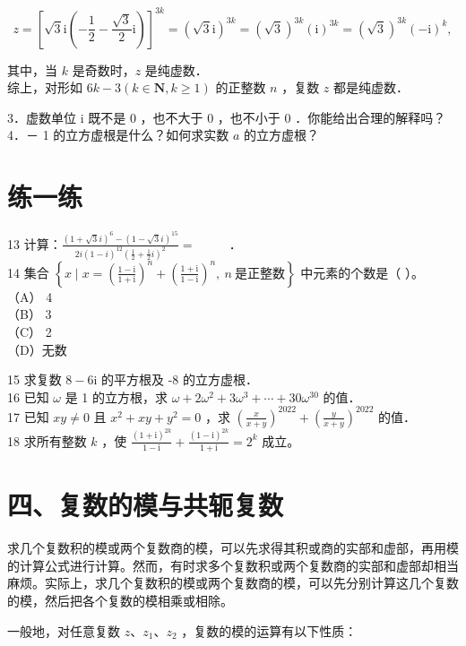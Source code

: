 \documentclass[10pt]{article}
\begin{document}
\[
z=\left[\sqrt{3} \mathrm{i}\left(-\frac{1}{2}-\frac{\sqrt{3}}{2} \mathrm{i}\right)\right]^{3 k}=(\sqrt{3} \mathrm{i})^{3 k}=(\sqrt{3})^{3 k}(\mathrm{i})^{3 k}=(\sqrt{3})^{3 k}(-\mathrm{i})^{k},
\]

其中，当 \(k\) 是奇数时，\(z\) 是纯虚数．\\
综上，对形如 \(6 k-3(k \in \mathbf{N}, k \geqslant 1)\) 的正整数 \(n\) ，复数 \(z\) 都是纯虚数．

3．虚数单位 i 既不是 0 ，也不大于 0 ，也不小于 0 ．你能给出合理的解释吗？\\
4．－ 1 的立方虚根是什么？如何求实数 \(a\) 的立方虚根？

\section*{练一练}
13 计算：\(\frac{(1+\sqrt{3} i)^{6}-(1-\sqrt{3} i)^{15}}{2 i(1-i)^{12}\left(\frac{1}{2}+\frac{1}{2} i\right)^{2}}=\) \(\qquad\) ．\\
14 集合 \(\left\{x \mid x=\left(\frac{1-\mathrm{i}}{1+\mathrm{i}}\right)^{n}+\left(\frac{1+\mathrm{i}}{1-\mathrm{i}}\right)^{n},\ n\ \text{是正整数}\right\}\) 中元素的个数是（ ）。\\
（A） 4\\
（B） 3\\
（C） 2\\
（D）无数

15 求复数 \(8-6 \mathrm{i}\) 的平方根及 -8 的立方虚根．\\
16 已知 \(\omega\) 是 1 的立方根，求 \(\omega+2 \omega^{2}+3 \omega^{3}+\cdots+30 \omega^{30}\) 的值．\\
17 已知 \(x y \neq 0\) 且 \(x^{2}+x y+y^{2}=0\) ，求 \(\left(\frac{x}{x+y}\right)^{2022}+\left(\frac{y}{x+y}\right)^{2022}\) 的值．\\
18 求所有整数 \(k\) ，使 \(\frac{(1+\mathrm{i})^{2 k}}{1-\mathrm{i}}+\frac{(1-\mathrm{i})^{2 k}}{1+\mathrm{i}}=2^{k}\) 成立。

\section*{四、复数的模与共轭复数}
求几个复数积的模或两个复数商的模，可以先求得其积或商的实部和虚部，再用模的计算公式进行计算。然而，有时求多个复数积或两个复数商的实部和虚部却相当麻烦。实际上，求几个复数积的模或两个复数商的模，可以先分别计算这几个复数的模，然后把各个复数的模相乘或相除。

一般地，对任意复数 \(z 、 z_{1} 、 z_{2}\) ，复数的模的运算有以下性质：
\end{document}
